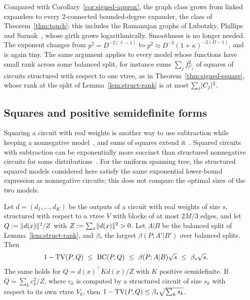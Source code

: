 Compared with Corollary~\ref{cor:signed-approx}, the graph class grows from linked expanders to every 2-connected bounded-degree expander, the class of Theorem~\ref{thm:touch}; this includes the Ramanujan graphs of Lubotzky, Phillips and Sarnak~\cite{LPS88}, whose girth grows logarithmically. Smoothness is no longer needed. The exponent changes from $p^2=D^{-2(\ell-1)}$ to $p^2\approx D^{-2}(1+\kappa)^{-2(D-1)}$, and is again tiny. The same argument applies to every model whose functions have small rank across some balanced split, for instance sums $\sum_jf_{C_j}^2$ of squares of circuits structured with respect to one vtree, as in Theorem~\ref{thm:signed-square}, whose rank at the split of Lemma~\ref{lem:struct-rank} is at most $\sum_j\lvert C_j\rvert^2$.

\subsection{Squares and positive semidefinite forms}

Squaring a circuit with real weights is another way to use subtraction while keeping a nonnegative model~\cite{LoconteEtAl24}, and sums of squares extend it~\cite{LoconteMengelVergari25}. Squared circuits with subtraction can be exponentially more succinct than structured nonnegative circuits for some distributions~\cite{LoconteEtAl24}. For the uniform spanning tree, the structured squared models considered here satisfy the same exponential lower-bound expression as nonnegative circuits; this does not compare the optimal sizes of the two models.

\begin{theorem}\label{thm:signed-square}
Let $d=(d_1,\dots,d_K)$ be the outputs of a circuit with real weights of size $s$, structured with respect to a vtree $V$ with blocks of at most $2M/3$ edges, and let $Q:=\lVert d(x)\rVert^2/Z$ with $Z:=\sum_x\lVert d(x)\rVert^2>0$. Let $A|B$ be the balanced split of Lemma~\ref{lem:struct-rank}, and $\beta_*$ the largest $\beta(P;A'|B')$ over balanced splits. Then
\[
  1-\TV(P,Q)\ \le\ \BC(P,Q)\ \le\ \beta(P;A|B)\sqrt s\ \le\ \beta_*\sqrt s .
\]
The same holds for $Q=d(x)^{\top}Kd(x)/Z$ with $K$ positive semidefinite. If $Q=\sum_kc_k^2/Z$, where $c_k$ is computed by a structured circuit of size $s_k$ with respect to its own vtree $V_k$, then $1-\mathrm{TV}(P,Q)\le\beta_*\sqrt{\sum_ks_k}$.
\end{theorem}

